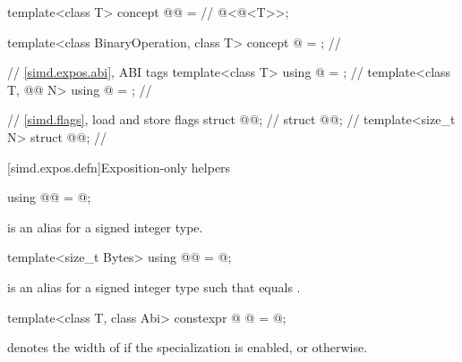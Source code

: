 \begin{codeblock}
template<class T>
  concept @@ =                                      // \expos
    @<@<T>>;

template<class BinaryOperation, class T>
  concept @ = \seebelownc@;                    // \expos

// \ref{simd.expos.abi},  ABI tags
template<class T> using @ = \seebelownc@;                      // \expos
template<class T, @@ N> using @ = \seebelownc@;  // \expos

// \ref{simd.flags}, load and store flags
struct @@;                                                 // \expos
struct @@;                                                 // \expos
template<size_t N> struct @@;                          // \expos
\end{codeblock}

[simd.expos.defn]{Exposition-only helpers}

\begin{itemdecl}
using @@ = @\seebelow@;
\end{itemdecl}

\begin{itemdescr}
\pnum
{} is an alias for a signed integer type.
\end{itemdescr}

\begin{itemdecl}
template<size_t Bytes> using @@ = @\seebelow@;
\end{itemdecl}

\begin{itemdescr}
\pnum
{} is an alias for a signed integer type
 such that  equals .
\end{itemdescr}

\begin{itemdecl}
template<class T, class Abi>
  constexpr @ @ = @\seebelow@;
\end{itemdecl}

\begin{itemdescr}
\pnum
{} denotes the width of  if the specialization  is enabled, or 
otherwise.
\end{itemdescr}

